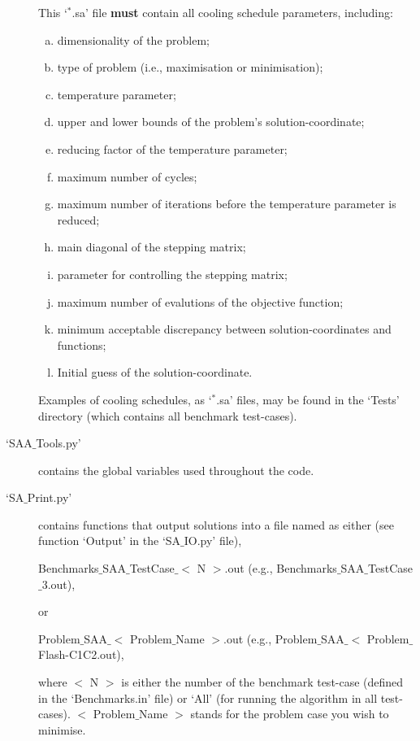 \documentclass[14pt,twoside]{article}
\begin{document}
\begin{description}
           This `$^{\ast}$.sa' file {\bf must} contain all cooling schedule parameters, including:
           \begin{enumerate}[a)]
               \item dimensionality of the problem;
               \item type of problem (i.e., maximisation or minimisation);
               \item temperature parameter;
               \item upper and lower bounds of the problem's solution-coordinate;
               \item reducing factor of the temperature parameter;
               \item maximum number of cycles;
               \item maximum number of iterations before the temperature parameter is reduced;
               \item main diagonal of the stepping matrix;
               \item parameter for controlling the stepping matrix;
               \item maximum number of evalutions of the objective function;
               \item minimum acceptable discrepancy between solution-coordinates and functions;
               \item Initial guess of the solution-coordinate.
           \end{enumerate}
           Examples of cooling schedules, as `$^{\ast}$.sa' files, may be found in the `Tests' directory (which contains all benchmark test-cases). 

      \item[`SAA$\_$Tools.py'] contains the global variables used throughout the code.

      \item[`SA$\_$Print.py'] contains functions that output solutions into a file named as either (see function `Output' in the `SA$\_$IO.py' file),
              \begin{center}
                   Benchmarks$\_$SAA$\_$TestCase$\_<$ N $>$.out (e.g., Benchmarks$\_$SAA$\_$TestCase$\_$3.out),
              \end{center}
     or 
              \begin{center}
                  Problem$\_$SAA$\_<$ Problem$\_$Name $>$.out  (e.g., Problem$\_$SAA$\_<$ Problem$\_$Flash-C1C2.out),
              \end{center}
     where $<$ N $>$ is either the number of the benchmark test-case (defined in the `Benchmarks.in' file) or `All' (for running the algorithm in all test-cases). $<$ Problem$\_$Name $>$ stands for the problem case you wish to minimise. 


\end{description}
\end{document}
